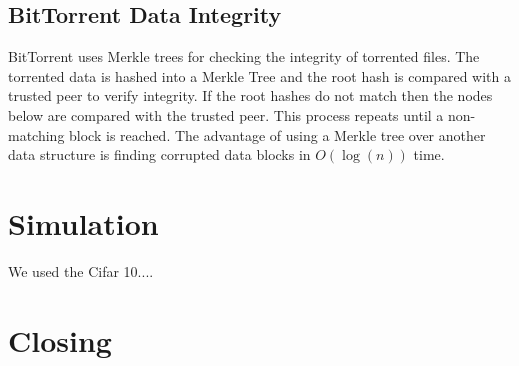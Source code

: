 \documentclass[12pt]{article}
\begin{document}
\subsection{BitTorrent Data Integrity} \label{sec:BitTorrent}

BitTorrent uses Merkle trees for checking the integrity of torrented files. The torrented data is hashed into a Merkle Tree and the root hash is compared with a trusted peer to verify integrity\cite{bep30}. If the root hashes do not match then the nodes below are compared with the trusted peer. This process repeats until a non-matching block is reached. The advantage of using a Merkle tree over another data structure is finding corrupted data blocks in $O(\log(n))$ time. 

\section{Simulation}

We used the Cifar 10....

\section{Closing}





\newpage

\printbibliography
\end{document}
